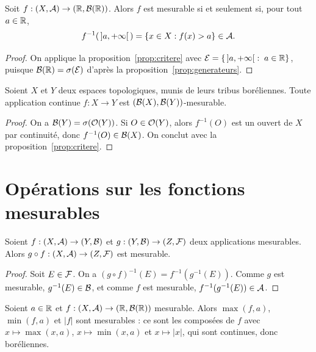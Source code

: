 \documentclass[11pt]{article}
\begin{document}
\begin{proposition}
Soit $f : (X,\mathcal{A}) \to (\mathbb{R},\mathcal{B}(\mathbb{R}))$. Alors $f$ est mesurable si et seulement si, pour tout $a \in \mathbb{R}$,
\[
  f^{-1}(\,]a,+\infty[\,) = \{x \in X : f(x) > a\} \in \mathcal{A}.
\]
\end{proposition}

\begin{proof}
On applique la proposition~\ref{prop:critere} avec $\mathcal{E} = \{\,]a,+\infty[ \;:\; a\in\mathbb{R}\}$, puisque $\mathcal{B}(\mathbb{R}) = \sigma(\mathcal{E})$ d'après la proposition~\ref{prop:generateurs}.
\end{proof}

\begin{proposition}
Soient $X$ et $Y$ deux espaces topologiques, munis de leurs tribus boréliennes. Toute application continue $f : X \to Y$ est $(\mathcal{B}(X),\mathcal{B}(Y))$-mesurable.
\end{proposition}

\begin{proof}
On a $\mathcal{B}(Y) = \sigma(\mathcal{O}(Y))$. Si $O \in \mathcal{O}(Y)$, alors $f^{-1}(O)$ est un ouvert de $X$ par continuité, donc $f^{-1}(O) \in \mathcal{B}(X)$. On conclut avec la proposition~\ref{prop:critere}.
\end{proof}


\section{Opérations sur les fonctions mesurables}

\begin{proposition}
Soient $f : (X,\mathcal{A}) \to (Y,\mathcal{B})$ et $g : (Y,\mathcal{B}) \to (Z,\mathcal{F})$ deux applications mesurables. Alors $g \circ f : (X,\mathcal{A}) \to (Z,\mathcal{F})$ est mesurable.
\end{proposition}

\begin{proof}
Soit $E \in \mathcal{F}$. On a $(g\circ f)^{-1}(E) = f^{-1}(g^{-1}(E))$. Comme $g$ est mesurable, $g^{-1}(E) \in \mathcal{B}$, et comme $f$ est mesurable, $f^{-1}(g^{-1}(E)) \in \mathcal{A}$.
\end{proof}

\begin{exemple}
Soient $a \in \mathbb{R}$ et $f : (X,\mathcal{A}) \to (\mathbb{R},\mathcal{B}(\mathbb{R}))$ mesurable. Alors $\max(f,a)$, $\min(f,a)$ et $|f|$ sont mesurables : ce sont les composées de $f$ avec $x \mapsto \max(x,a)$, $x \mapsto \min(x,a)$ et $x \mapsto |x|$, qui sont continues, donc boréliennes.
\end{exemple}
\end{document}
